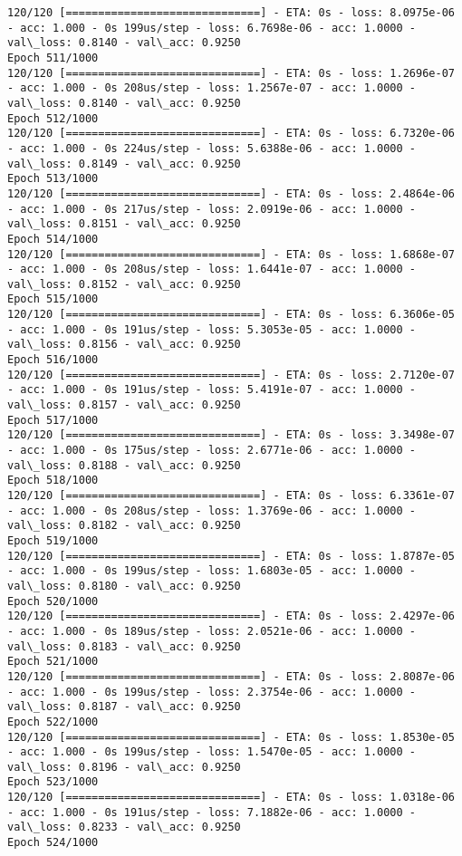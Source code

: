 \documentclass[11pt]{article}
\begin{document}
\begin{Verbatim}[commandchars=\\\{\}]
120/120 [==============================] - ETA: 0s - loss: 8.0975e-06 - acc: 1.000 - 0s 199us/step - loss: 6.7698e-06 - acc: 1.0000 - val\_loss: 0.8140 - val\_acc: 0.9250
Epoch 511/1000
120/120 [==============================] - ETA: 0s - loss: 1.2696e-07 - acc: 1.000 - 0s 208us/step - loss: 1.2567e-07 - acc: 1.0000 - val\_loss: 0.8140 - val\_acc: 0.9250
Epoch 512/1000
120/120 [==============================] - ETA: 0s - loss: 6.7320e-06 - acc: 1.000 - 0s 224us/step - loss: 5.6388e-06 - acc: 1.0000 - val\_loss: 0.8149 - val\_acc: 0.9250
Epoch 513/1000
120/120 [==============================] - ETA: 0s - loss: 2.4864e-06 - acc: 1.000 - 0s 217us/step - loss: 2.0919e-06 - acc: 1.0000 - val\_loss: 0.8151 - val\_acc: 0.9250
Epoch 514/1000
120/120 [==============================] - ETA: 0s - loss: 1.6868e-07 - acc: 1.000 - 0s 208us/step - loss: 1.6441e-07 - acc: 1.0000 - val\_loss: 0.8152 - val\_acc: 0.9250
Epoch 515/1000
120/120 [==============================] - ETA: 0s - loss: 6.3606e-05 - acc: 1.000 - 0s 191us/step - loss: 5.3053e-05 - acc: 1.0000 - val\_loss: 0.8156 - val\_acc: 0.9250
Epoch 516/1000
120/120 [==============================] - ETA: 0s - loss: 2.7120e-07 - acc: 1.000 - 0s 191us/step - loss: 5.4191e-07 - acc: 1.0000 - val\_loss: 0.8157 - val\_acc: 0.9250
Epoch 517/1000
120/120 [==============================] - ETA: 0s - loss: 3.3498e-07 - acc: 1.000 - 0s 175us/step - loss: 2.6771e-06 - acc: 1.0000 - val\_loss: 0.8188 - val\_acc: 0.9250
Epoch 518/1000
120/120 [==============================] - ETA: 0s - loss: 6.3361e-07 - acc: 1.000 - 0s 208us/step - loss: 1.3769e-06 - acc: 1.0000 - val\_loss: 0.8182 - val\_acc: 0.9250
Epoch 519/1000
120/120 [==============================] - ETA: 0s - loss: 1.8787e-05 - acc: 1.000 - 0s 199us/step - loss: 1.6803e-05 - acc: 1.0000 - val\_loss: 0.8180 - val\_acc: 0.9250
Epoch 520/1000
120/120 [==============================] - ETA: 0s - loss: 2.4297e-06 - acc: 1.000 - 0s 189us/step - loss: 2.0521e-06 - acc: 1.0000 - val\_loss: 0.8183 - val\_acc: 0.9250
Epoch 521/1000
120/120 [==============================] - ETA: 0s - loss: 2.8087e-06 - acc: 1.000 - 0s 199us/step - loss: 2.3754e-06 - acc: 1.0000 - val\_loss: 0.8187 - val\_acc: 0.9250
Epoch 522/1000
120/120 [==============================] - ETA: 0s - loss: 1.8530e-05 - acc: 1.000 - 0s 199us/step - loss: 1.5470e-05 - acc: 1.0000 - val\_loss: 0.8196 - val\_acc: 0.9250
Epoch 523/1000
120/120 [==============================] - ETA: 0s - loss: 1.0318e-06 - acc: 1.000 - 0s 191us/step - loss: 7.1882e-06 - acc: 1.0000 - val\_loss: 0.8233 - val\_acc: 0.9250
Epoch 524/1000

\end{Verbatim}
\end{document}
